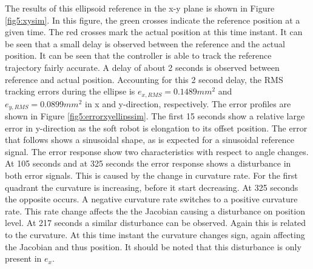 The results of this ellipsoid reference in the x-y plane is shown in Figure \ref{fig5:xysim}. In this figure, the green crosses indicate the reference position at a given time. The red crosses mark the actual position at this time instant. It can be seen that a small delay is observed between the reference and the actual position. It can be seen that the controller is able to track the reference trajectory fairly accurate. A delay of about 2 seconds is observed between reference and actual position. Accounting for this 2 second delay, the RMS tracking errors during the ellipse is $e_{x,RMS} = 0.1489 mm^2$ and $e_{y,RMS} =0.0899 mm^2$ in x and y-direction, respectively. The error profiles are shown in Figure \ref{fig5:errorxyellipssim}. The first 15 seconds show a relative large error in y-direction as the soft robot is elongation to its offset position. The error that follows shows a sinusoidal shape, as is expected for a sinusoidal reference signal. The error response show two characteristics with respect to angle changes. At 105 seconds and at 325 seconds the error response shows a disturbance in both error signals. This is caused by the change in curvature rate. For the first quadrant the curvature is increasing, before it start decreasing. At 325 seconds the opposite occurs. A negative curvature rate switches to a positive curvature rate. This rate change affects the the Jacobian causing a disturbance on position level. At 217 seconds a similar disturbance can be observed. Again this is related to the curvature. At this time instant the curvature changes sign, again affecting the Jacobian and thus position. It should be noted that this disturbance is only present in $e_x$.



